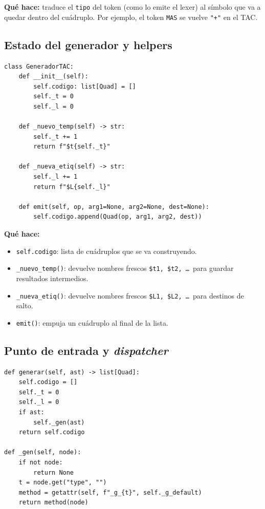 \documentclass[11pt,a4paper]{article}
\begin{document}
\textbf{Qué hace:} traduce el \texttt{tipo} del token (como lo emite el lexer)
al símbolo que va a quedar dentro del cuádruplo. Por ejemplo, el token
\texttt{MAS} se vuelve \texttt{"+"} en el TAC.

\subsection{Estado del generador y helpers}

\begin{lstlisting}[style=py]
class GeneradorTAC:
    def __init__(self):
        self.codigo: list[Quad] = []
        self._t = 0
        self._l = 0

    def _nuevo_temp(self) -> str:
        self._t += 1
        return f"$t{self._t}"

    def _nueva_etiq(self) -> str:
        self._l += 1
        return f"$L{self._l}"

    def emit(self, op, arg1=None, arg2=None, dest=None):
        self.codigo.append(Quad(op, arg1, arg2, dest))
\end{lstlisting}

\textbf{Qué hace:}
\begin{itemize}[leftmargin=*,nosep]
  \item \texttt{self.codigo}: lista de cuádruplos que se va construyendo.
  \item \texttt{\_nuevo\_temp()}: devuelve nombres frescos
        \texttt{\$t1, \$t2, \dots}\ para guardar resultados intermedios.
  \item \texttt{\_nueva\_etiq()}: devuelve nombres frescos
        \texttt{\$L1, \$L2, \dots}\ para destinos de salto.
  \item \texttt{emit()}: empuja un cuádruplo al final de la lista.
\end{itemize}

\subsection{Punto de entrada y \textit{dispatcher}}

\begin{lstlisting}[style=py]
def generar(self, ast) -> list[Quad]:
    self.codigo = []
    self._t = 0
    self._l = 0
    if ast:
        self._gen(ast)
    return self.codigo

def _gen(self, node):
    if not node:
        return None
    t = node.get("type", "")
    method = getattr(self, f"_g_{t}", self._g_default)
    return method(node)
\end{lstlisting}
\end{document}
